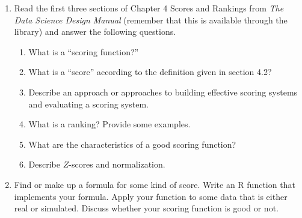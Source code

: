 \documentclass[12pt]{article}
\begin{document}
\begin{enumerate}
    \item Read the first three sections of Chapter 4 Scores and Rankings from \emph{The Data Science Design Manual} (remember that this is available through the library) and answer the following questions.
     \begin{enumerate}
      \item  What is a ``scoring function?''
      \item What is a ``score'' according to the definition given in section 4.2?
      \item Describe an approach or approaches to building effective scoring systems and evaluating a scoring system. 
      \item What is a ranking? Provide some examples. 
      \item What are the characteristics of a good scoring function? 
      \item Describe $Z$-scores and normalization.       
    \end{enumerate}
    \item Find or make up a formula for some kind of score. Write an R function that implements your formula. Apply your function to some data that is either real or simulated.  Discuss whether your scoring function is good or not.  
  \end{enumerate}
\end{document}
